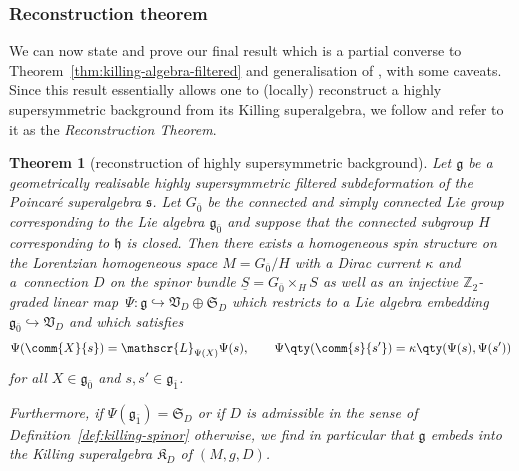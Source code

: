 \documentclass[pdftex]{sigma}
\numberwithin{equation}{section}
\newtheorem{Theorem}{Theorem}[section]
\newcommand{\fg}{\mathfrak{g}}
\newcommand{\fh}{\mathfrak{h}}
\newcommand{\fs}{\mathfrak{s}}
\newcommand{\fK}{\mathfrak{K}}
\newcommand{\fS}{\mathfrak{S}}
\newcommand{\fV}{\mathfrak{V}}
\newcommand{\ZZ}{\mathbb{Z}}
\newcommand{\eL}{\mathscr{L}}
\newcommand{\Sbundle}{\underline{S}}
\newcommand{\1}{\mathbbm{1}}
\begin{document}
\subsubsection{Reconstruction theorem}

We can now state and prove our final result which is a partial converse to Theorem~\ref{thm:killing-algebra-filtered} and generalisation of \cite[Theorem~13]{Figueroa-OFarrill2017_1}, with some caveats. Since this result essentially allows one to (locally) reconstruct a highly supersymmetric background from its Killing superalgebra, we follow \cite{Figueroa-OFarrill2017_1,Santi2022} and refer to it as the \emph{Reconstruction Theorem}.

\begin{Theorem}[reconstruction of highly supersymmetric background]\label{thm:homog-spin-mfld}	
	Let $\fg$ be a geometrically realisable highly supersymmetric filtered subdeformation of the Poincar\'e superalgebra $\fs$.
	Let $G_{\overline0}$ be the connected and simply connected Lie group corresponding to the Lie algebra $\fg_{\overline0}$ and suppose that the connected subgroup $H$ corresponding to $\fh$ is closed.
	Then there exists a homogeneous spin structure on the Lorentzian homogeneous space $M=G_{\overline0}/H$ with a Dirac current $\kappa$ and a~connection $D$ on the spinor bundle $\Sbundle=G_{\overline 0}\times_H S$ as well as an injective $\ZZ_2$-graded linear map~${\Psi\colon\fg\hookrightarrow\fV_D\oplus\fS_D}$ which restricts to a Lie algebra embedding $\fg_{\overline 0}\hookrightarrow\fV_D$ and which satisfies
	\begin{align}\label{eq:reconstruct-brackets}
		\Psi(\comm{X}{s}) = \eL_{\Psi(X)}\Psi(s),
		\qquad \Psi\qty(\comm{s}{s'}) = \kappa\qty(\Psi(s),\Psi(s'))
	\end{align}
	for all $X\in\fg_{\overline 0}$ and $s,s'\in \fg_{\overline 1}$.
	
	Furthermore, if $\Psi(\fg_{\overline 1})=\fS_D$ or if $D$ is admissible in the sense of Definition~{\rm\ref{def:killing-spinor}} otherwise, we find in particular that $\fg$ embeds into the Killing superalgebra $\fK_D$ of $(M,g,D)$.
\end{Theorem}
\end{document}
